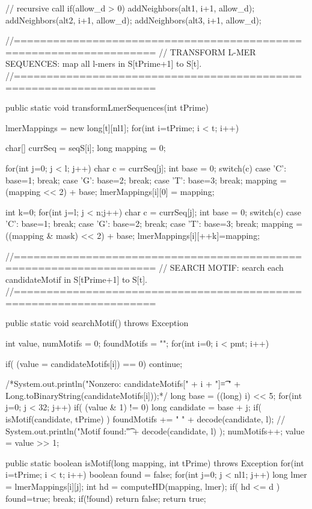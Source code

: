 \documentclass[oneside,12pt]{DISCSthesis}
\begin{document}
{\begin{footnotesize}
\begin{verbatimtab}[2]
{{{			// recursive call
			if(allow_d > 0) {
				addNeighbors(alt1, i+1, allow_d);
				addNeighbors(alt2, i+1, allow_d);
				addNeighbors(alt3, i+1, allow_d);
			}

		}
	}

//===================================================================
// TRANSFORM L-MER SEQUENCES: map all l-mers in S[tPrime+1] to S[t].
//===================================================================

	public static void transformLmerSequences(int tPrime) {
		lmerMappings = new long[t][nl1];
		for(int i=tPrime; i < t; i++) {
			char[] currSeq = seqS[i];
			long mapping = 0;

			for(int j=0; j < l; j++) {
				char c = currSeq[j];
				int base = 0;
				switch(c) {
					case 'C': base=1; break;
					case 'G': base=2; break;
					case 'T': base=3; break;
				}
				mapping = (mapping << 2) + base;
			}
			lmerMappings[i][0] = mapping;

			int k=0;
			for(int j=l; j < n;j++) {
				char c = currSeq[j];
				int base = 0;
				switch(c) {
					case 'C': base=1; break;
					case 'G': base=2; break;
					case 'T': base=3; break;
				}
				mapping = ((mapping & mask) << 2) + base;
				lmerMappings[i][++k]=mapping;
			}

		}
	}

//===================================================================
// SEARCH MOTIF: search each candidateMotif in S[tPrime+1] to S[t].
//===================================================================

	public static void searchMotif() throws Exception {
		int value, numMotifs = 0;
		foundMotifs = "";
		for(int i=0; i < pmt; i++) {
			if( (value = candidateMotifs[i]) == 0)
				continue;

			/*System.out.println("Nonzero: candidateMotifs[" + i + "]\t= "
				+ Long.toBinaryString(candidateMotifs[i]));*/
			long base = ((long) i) << 5;
			for(int j=0; j < 32; j++) {
				if( (value & 1) != 0) {
					long candidate = base + j;
					if( isMotif(candidate, tPrime) ) {
						foundMotifs += " " + decode(candidate, l);
						// System.out.println("Motif found:\t" + decode(candidate, l) );
						numMotifs++;
					}
				}
				value = value >> 1;
			}
		}
	}

	public static boolean isMotif(long mapping, 
																int tPrime) throws Exception {
		for(int i=tPrime; i < t; i++) {
			boolean found = false;
			for(int j=0; j < nl1; j++) {
				long lmer = lmerMappings[i][j];
				int hd = computeHD(mapping, lmer);
				if( hd <= d ) {
					found=true;
					break;
				}
			}
			if(!found) {
				return false;
			}
		}
		return true;
	}

}
\end{verbatimtab}
\end{footnotesize}}
\end{document}
